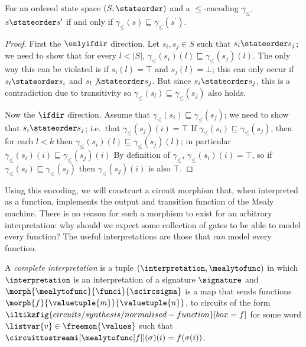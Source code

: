 \documentclass{lmcs}
\begin{document}
\begin{lem}
    For an ordered state space \((S,\stateorder)\) and a \(\leq\)-encoding
    \(\gamma_\leq\), \(s \stateorder s^\prime\) if and only if
    \(\gamma_\leq(s) \sqsubseteq \gamma_\leq(s^\prime)\).
\end{lem}
\begin{proof}
    First the \(\onlyifdir\) direction.
    Let \(s_i, s_j \in S\) such that \(s_i \stateorder s_j\); we need to show
    that for every \(l < |S|\),
    \(\gamma_\leq(s_i)(l) \sqsubseteq \gamma_\leq(s_j)(l)\).
    The only way this can be violated is if \(s_i(l) = \top\) and
    \(s_j(l) = \bot\); this can only occur if \(s_l \stateorder s_i\) and
    \(s_l \not\stateorder s_j\).
    But since \(s_i \stateorder s_j\), this is a contradiction due to
    transitivity so \(\gamma_\leq(s_l) \sqsubseteq \gamma_\leq(s_j)\) also
    holds.

    Now the \(\ifdir\) direction.
    Assume that \(\gamma_\leq(s_i) \sqsubseteq \gamma_\leq(s_j)\); we need to
    show that \(s_i \stateorder s_j\); i.e.\ that \(\gamma_\leq(s_j)(i) = \top\)
    If \(\gamma_\leq(s_i) \sqsubseteq \gamma_\leq(s_j)\), then for each
    \(l < k\) then \(\gamma_\leq(s_i)(l) \sqsubseteq \gamma_\leq(s_j)(l)\);
    in particular \(\gamma_\leq(s_i)(i) \sqsubseteq \gamma_\leq(s_j)(i)\)
    By definition of \(\gamma_\leq\), \(\gamma_\leq(s_i)(i) = \top\), so if
    \(\gamma_\leq(s_i) \sqsubseteq \gamma_\leq(s_j)\) then
    \(\gamma_\leq(s_j)(i)\) is also \(\top\).
\end{proof}

Using this encoding, we will construct a circuit morphism that,
when interpreted as a function, implements the output and transition function
of the Mealy machine.
There is no reason for such a morphism to exist for an arbitrary interpretation:
why should we expect some collection of gates to be able to model every
function?
The useful interpretations are those that \emph{can} model every function.

\begin{defi}\label{def:functional-completeness}
    A \emph{complete interpretation} is a tuple
    \((\interpretation,\mealytofunc)\) in which \(\interpretation\) is an
    interpretation of a signature \(\signature\) and \(
    \morph{\mealytofunc}{\funci}{\scircsigma}
    \) is a map that sends functions \(
    \morph{f}{\valuetuple{m}}{\valuetuple{n}}
    \), to circuits of the form \(
    \iltikzfig{circuits/synthesis/normalised-function}[box=f]
    \) for some word \(\listvar{v} \in \freemon{\values}\) such that
    \(\circuittostreami[\mealytofunc[f]](\sigma)(i) = f(\sigma(i))\).
\end{defi}
\end{document}

